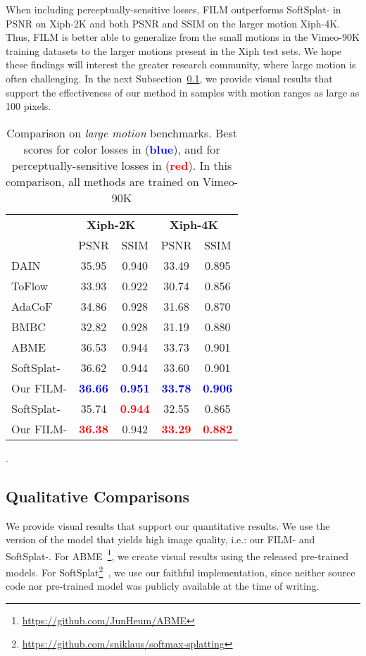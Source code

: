 \documentclass[runningheads]{llncs}
\begin{document}
When including perceptually-sensitive losses, FILM outperforms SoftSplat- in PSNR on Xiph-2K and both PSNR and SSIM on the larger motion Xiph-4K. Thus, FILM is better able to generalize from the small motions in the Vimeo-90K training datasets to the larger motions present in the Xiph test sets. We hope these findings will interest the greater research community, where large motion is often challenging. 
In the next Subsection~\ref{subsec:qualitative_comparisons}, we provide visual results that support the effectiveness of our method in samples with motion ranges as large as 100 pixels. 
\begin{table}[t!]
\small
\renewcommand\tabcolsep{3.0pt}
\centering
\begin{tabular}{lcc@{\hskip 0.5cm}cc}
\toprule
&  \multicolumn{2}{c}{\textbf{Xiph-2K}~\cite{xiph}}{\hskip 0.5cm} & \multicolumn{2}{c}{\textbf{Xiph-4K}~\cite{xiph}}{\hskip 0.5cm} \\
\cline{2-5}
 & PSNR & SSIM & PSNR & SSIM \\ 
\hline
DAIN & 35.95 & 0.940 & 33.49 & 0.895 \\ 
ToFlow & 33.93 & 0.922 & 30.74 & 0.856 \\
AdaCoF & 34.86 & 0.928 & 31.68 & 0.870 \\ 
BMBC & 32.82 & 0.928 & 31.19 & 0.880 \\ 
ABME & 36.53 & 0.944 & 33.73 & 0.901 \\ 
SoftSplat- & 36.62 & 0.944 & 33.60 & 0.901 \\ 
Our FILM- & \textbf{\textcolor{blue}{36.66}} & \textbf{\textcolor{blue}{0.951}} & \textbf{\textcolor{blue}{33.78}} & \textbf{\textcolor{blue}{0.906}} \\ 
\hline
SoftSplat- & 35.74 & \textbf{\textcolor{red}{0.944}} & 32.55 & 0.865 \\
Our FILM- & \textbf{\textcolor{red}{36.38}} & 0.942 & \textbf{\textcolor{red}{33.29}} & \textbf{\textcolor{red}{0.882}} \\ 
\bottomrule
\end{tabular}
\caption{Comparison on {\em large motion} benchmarks. Best scores for color losses in (\textbf{\textcolor{blue}{blue}}), and for perceptually-sensitive losses in (\textbf{\textcolor{red}{red}}). In this comparison, all methods are trained on Vimeo-90K}.
\label{tab:large_motion}
\vspace{-4ex}
\end{table}
 
\subsection{Qualitative Comparisons}
\label{subsec:qualitative_comparisons}
We provide visual results that support our quantitative results. We use the version of the model that yields high image quality, i.e.: our FILM- and SoftSplat-. For ABME~\footnote{\url{https://github.com/JunHeum/ABME}}, we create visual results using the released pre-trained models. For SoftSplat\footnote{\url{https://github.com/sniklaus/softmax-splatting}\label{softmax}}~\cite{softsplat-2020}, we use our faithful implementation, since neither source code nor pre-trained model was publicly available at the time of writing. 
\end{document}

